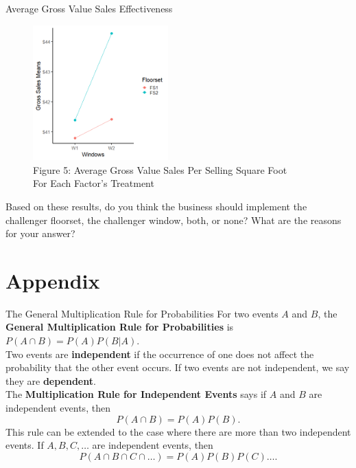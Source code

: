 \documentclass[pdf]{beamer}
\newcommand{\empr}[1]{{\color{franklinblue}\textbf{#1}}}
\theoremstyle{remark}
\theoremstyle{definition}
\begin{document}
\begin{frame}[t]{Average Gross Value Sales Effectiveness}
\begin{figure}[htbp]
  \captionsetup{justification=centering}
  \includegraphics[height=5.2cm, trim=0.0cm 0.0cm 0.0cm 0.0cm width=5.2cm]{Images/ANOVA_RESULTS.png}
  \caption{Figure {\color{franklinblue} 5}: Average Gross Value Sales Per Selling Square Foot \\ For Each Factor's Treatment}
\end{figure}
\vspace{-2.0ex}
\small
Based on these results, do you think the business should implement the challenger floorset, the  challenger window, both, or none?  What are the reasons for your answer?
\end{frame}

\section{Appendix}

\begin{frame}[t]{The General Multiplication Rule for Probabilities}
For two events $A$ and $B$, the \empr{General Multiplication Rule for Probabilities} is $P(A \cap B) = P(A)P(B|A)$. \\
\vspace{1.5ex}
Two events are \empr{independent} if the occurrence of one does not affect the probability that the other event occurs. If two events are not independent, we say they are \empr{dependent}. \\
\vspace{1.5ex}
The \empr{Multiplication Rule for Independent Events} says if $A$ and $B$ are independent events, then 
\begin{equation}
P(A \cap B) = P(A) P(B).
\end{equation}
This rule can be extended to the case where there are more than two independent events. If $A, B, C, \ldots $ are independent events, then
\begin{equation}
P(A \cap B \cap C \cap \ldots) = P(A) P(B) P(C)\ldots.
\end{equation}
\end{frame}
\end{document}
